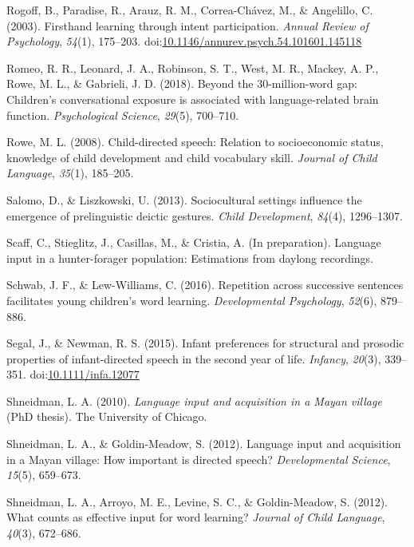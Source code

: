 \documentclass[floatsintext,man]{apa6}
\theoremstyle{definition}
\theoremstyle{definition}
\theoremstyle{definition}
\theoremstyle{remark}
\begin{document}
\hypertarget{ref-rogoff2003firsthand}{}
Rogoff, B., Paradise, R., Arauz, R. M., Correa-Chávez, M., \& Angelillo,
C. (2003). Firsthand learning through intent participation. \emph{Annual
Review of Psychology}, \emph{54}(1), 175--203.
doi:\href{https://doi.org/10.1146/annurev.psych.54.101601.145118}{10.1146/annurev.psych.54.101601.145118}

\hypertarget{ref-romeo2018beyond}{}
Romeo, R. R., Leonard, J. A., Robinson, S. T., West, M. R., Mackey, A.
P., Rowe, M. L., \& Gabrieli, J. D. (2018). Beyond the 30-million-word
gap: Children's conversational exposure is associated with
language-related brain function. \emph{Psychological Science},
\emph{29}(5), 700--710.

\hypertarget{ref-rowe2008child}{}
Rowe, M. L. (2008). Child-directed speech: Relation to socioeconomic
status, knowledge of child development and child vocabulary skill.
\emph{Journal of Child Language}, \emph{35}(1), 185--205.

\hypertarget{ref-salomo2013sociocultural}{}
Salomo, D., \& Liszkowski, U. (2013). Sociocultural settings influence
the emergence of prelinguistic deictic gestures. \emph{Child
Development}, \emph{84}(4), 1296--1307.

\hypertarget{ref-scaffIPlanguage}{}
Scaff, C., Stieglitz, J., Casillas, M., \& Cristia, A. (In preparation).
Language input in a hunter-forager population: Estimations from daylong
recordings.

\hypertarget{ref-schwab2016repetition}{}
Schwab, J. F., \& Lew-Williams, C. (2016). Repetition across successive
sentences facilitates young children's word learning.
\emph{Developmental Psychology}, \emph{52}(6), 879--886.

\hypertarget{ref-segal2015infant}{}
Segal, J., \& Newman, R. S. (2015). Infant preferences for structural
and prosodic properties of infant-directed speech in the second year of
life. \emph{Infancy}, \emph{20}(3), 339--351.
doi:\href{https://doi.org/10.1111/infa.12077}{10.1111/infa.12077}

\hypertarget{ref-shneidman2010language}{}
Shneidman, L. A. (2010). \emph{Language input and acquisition in a Mayan
village} (PhD thesis). The University of Chicago.

\hypertarget{ref-shneidman2012language}{}
Shneidman, L. A., \& Goldin-Meadow, S. (2012). Language input and
acquisition in a Mayan village: How important is directed speech?
\emph{Developmental Science}, \emph{15}(5), 659--673.

\hypertarget{ref-shneidman2012counts}{}
Shneidman, L. A., Arroyo, M. E., Levine, S. C., \& Goldin-Meadow, S.
(2012). What counts as effective input for word learning? \emph{Journal
of Child Language}, \emph{40}(3), 672--686.
\end{document}
